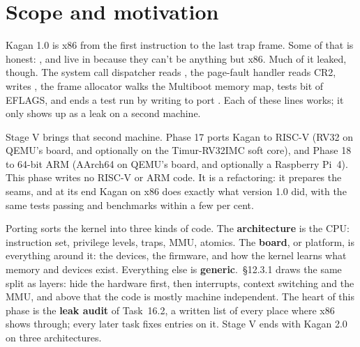 \documentclass[11pt,a4paper]{article}
\begin{document}


\section{Scope and motivation}

Kagan 1.0 is x86 from the first instruction to the last trap frame. Some of that is honest: ,
 and  live in  because they can't be anything but x86. Much of it
leaked, though. The system call dispatcher reads , the page-fault handler reads CR2,  writes
, the frame allocator walks the Multiboot memory map,  tests bit  of
EFLAGS, and  ends a test run by writing to port . Each of these lines works; it only shows up as
a leak on a second machine.

Stage V brings that second machine. Phase 17 ports Kagan to RISC-V (RV32 on QEMU's  board, and optionally
on the Timur-RV32IMC soft core), and Phase 18 to 64-bit ARM (AArch64 on QEMU's  board, and optionally a
Raspberry Pi~4). This phase writes no RISC-V or ARM code. It is a refactoring: it prepares the seams, and at its end
Kagan on x86 does exactly what version 1.0 did, with the same tests passing and benchmarks within a few per cent.

Porting sorts the kernel into three kinds of code. The \textbf{architecture} is the CPU: instruction set, privilege
levels, traps, MMU, atomics. The \textbf{board}, or platform, is everything around it: the devices, the firmware, and
how the kernel learns what memory and devices exist. Everything else is \textbf{generic}. \MOS\,\S12.3.1 draws the
same split as layers: hide the hardware first, then interrupts, context switching and the MMU, and above that the code
is mostly machine independent. The heart of this phase is the \textbf{leak audit} of Task~16.2, a written list of
every place where x86 shows through; every later task fixes entries on it.
Stage V ends with Kagan 2.0 on three architectures.
\end{document}
